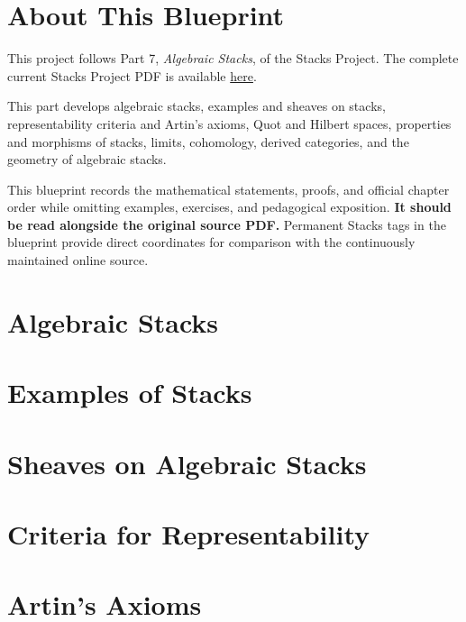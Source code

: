 

\chapter*{About This Blueprint}

This project follows Part 7, \emph{Algebraic Stacks}, of the Stacks Project.
The complete current Stacks Project PDF is available
\href{https://stacks.math.columbia.edu/download/book.pdf}{here}.

This part develops algebraic stacks, examples and sheaves on stacks,
representability criteria and Artin's axioms, Quot and Hilbert spaces,
properties and morphisms of stacks, limits, cohomology, derived categories,
and the geometry of algebraic stacks.

This blueprint records the mathematical statements, proofs, and official
chapter order while omitting examples, exercises, and pedagogical exposition.
\textbf{It should be read alongside the original source PDF.} Permanent Stacks
tags in the blueprint provide direct coordinates for comparison with the
continuously maintained online source.

\chapter{Algebraic Stacks}
\label{chap:algebraic}


\chapter{Examples of Stacks}
\label{chap:examples-stacks}


\chapter{Sheaves on Algebraic Stacks}
\label{chap:stacks-sheaves}


\chapter{Criteria for Representability}
\label{chap:criteria}


\chapter{Artin's Axioms}
\label{chap:artin}


